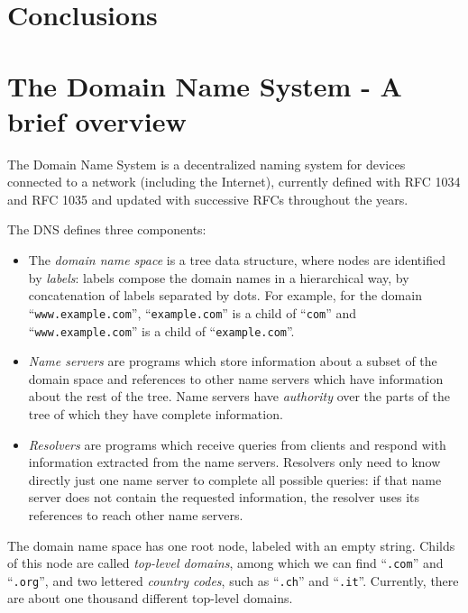 \documentclass[mscthesis]{usiinfthesis}
\begin{document}
\chapter{Conclusions}


\appendix 

\chapter{The Domain Name System - A brief overview}\label{appx:dns}
The Domain Name System is a decentralized naming system for devices connected to a network (including the Internet), currently defined with RFC 1034\cite{rfc:1034} and RFC 1035\cite{rfc:1035} and updated with successive RFCs throughout the years.

The DNS defines three components:
\begin{itemize}
	\item The \emph{domain name space} is a tree data structure, where nodes are identified by \emph{labels}: labels compose the domain names in a hierarchical way, by concatenation of labels separated by dots. For example, for the domain ``\texttt{www.example.com}'', ``\texttt{example.com}'' is a child of ``\texttt{com}'' and ``\texttt{www.example.com}'' is a child of ``\texttt{example.com}''.
	\item \emph{Name servers} are programs which store information about a subset of the domain space and references to other name servers which have information about the rest of the tree. Name servers have \emph{authority} over the parts of the tree of which they have complete information.
	\item \emph{Resolvers} are programs which receive queries from clients and respond with information extracted from the name servers. Resolvers only need to know directly just one name server to complete all possible queries: if that name server does not contain the requested information, the resolver uses its references to reach other name servers.
\end{itemize}
The domain name space has one root node, labeled with an empty string. Childs of this node are called \emph{top-level domains}, among which we can find ``\texttt{.com}'' and ``\texttt{.org}'', and two lettered \emph{country codes}, such as ``\texttt{.ch}'' and ``\texttt{.it}''. Currently, there are about one thousand different top-level domains\cite{website:tldlist}.
\end{document}
